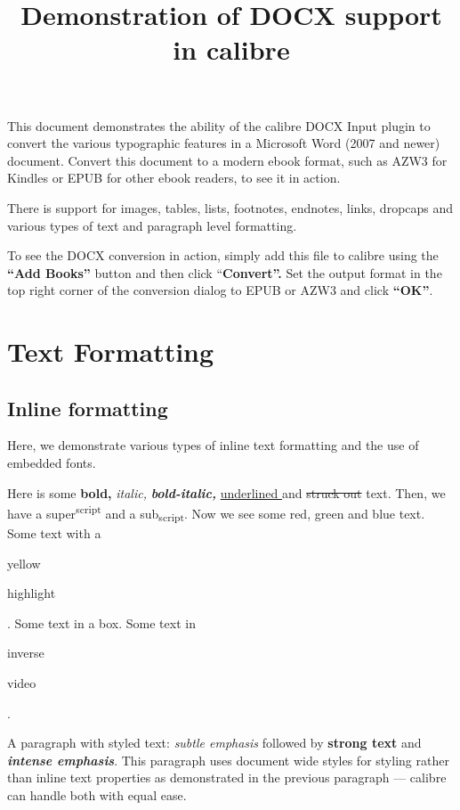 \documentclass[11pt]{article}
\title{\protect\textcolor{hex17365D}{Demonstration of DOCX support in calibre}}
\author{}
\date{}
\begin{document}
\label{_Toc581531977}\label{demonstration-of-docx-support-in-calibre}\maketitle

This document demonstrates the ability of the calibre DOCX Input plugin to convert the various typographic features in a Microsoft Word (2007 and newer) document. Convert this document to a modern ebook format, such as AZW3 for Kindles or EPUB for other ebook readers, to see it in action.

There is support for images, tables, lists, footnotes, endnotes, links, dropcaps and various types of text and paragraph level formatting.

To see the DOCX conversion in action, simply add this file to calibre using the \textbf{“Add Books” }button and then click “\textbf{Convert”. } Set the output format in the top right corner of the conversion dialog to EPUB or AZW3 and click \textbf{“OK”}.

\section[{Text Formatting}]{\protect\textcolor{hex365F91}{Text Formatting}}\label{_Toc2054249818}\label{text-formatting}

\subsection[{Inline formatting}]{\protect\textcolor{hex4F81BD}{Inline formatting}}\label{_Toc2137712100}\label{inline-formatting}

Here, we demonstrate various types of inline text formatting and the use of embedded fonts.

Here is some \textbf{bold, }\textit{italic, }\textit{\textbf{bold-italic, }}\uline{underlined }and \sout{struck out } text. Then, we have a super\textsuperscript{script} and a sub\textsubscript{script}. Now we see some \textcolor{hexFF0000}{red}, \textcolor{hex92D050}{green} and \textcolor{hex0070C0}{blue} text. Some text with a {\setlength{\fboxsep}{1pt}\colorbox{hexFFFF00}{\strut yellow} \colorbox{hexFFFF00}{\strut highlight}}. Some text in a box. Some text in \textcolor{hexFFFFFF}{{\setlength{\fboxsep}{1pt}\colorbox{hex000000}{\strut inverse} \colorbox{hex000000}{\strut video}}}.

A paragraph with styled text: \textcolor{hex808080}{\textit{subtle emphasis  }}followed by \textbf{strong text }and \textcolor{hex4F81BD}{\textit{\textbf{intense emphasis}}}. This paragraph uses document wide styles for styling rather than inline text properties as demonstrated in the previous paragraph — calibre can handle both with equal ease.
\end{document}
